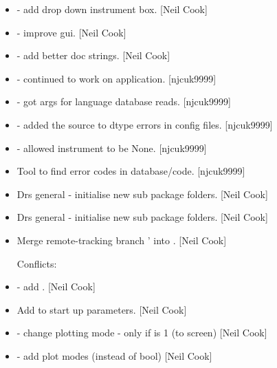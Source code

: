\documentclass[a4paper,10pt,english]{report}
\begin{document}
\begin{itemize}
\item {} 
 - add drop down instrument box. {[}Neil Cook{]}

\item {} 
 - improve gui. {[}Neil Cook{]}

\item {} 
 - add better doc strings. {[}Neil Cook{]}

\item {} 
 - continued to work on application. {[}njcuk9999{]}

\item {} 
 - got args for language database reads. {[}njcuk9999{]}

\item {} 
 - added the source to dtype errors in config
files. {[}njcuk9999{]}

\item {} 
 - allowed instrument to be None. {[}njcuk9999{]}

\item {} 
Tool to find error codes in database/code. {[}njcuk9999{]}

\item {} 
Drs general - initialise new sub package folders. {[}Neil Cook{]}

\item {} 
Drs general - initialise new sub package folders. {[}Neil Cook{]}

\item {} 
Merge remote-tracking branch ’ into .
{[}Neil Cook{]}
\begin{description}
\item[{Conflicts:}] \leavevmode
{}

\end{description}

\item {} 
 - add . {[}Neil Cook{]}

\item {} 
Add  to start up parameters. {[}Neil Cook{]}

\item {} 
 - change plotting mode - only if  is 1 (to
screen) {[}Neil Cook{]}

\item {} 
 - add plot modes (instead of bool) {[}Neil Cook{]}

\end{itemize}
\end{document}
